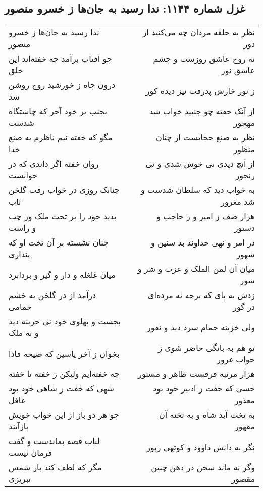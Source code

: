 \begin{center}
\section*{غزل شماره ۱۱۴۴: ندا رسید به جان‌ها ز خسرو منصور}
\label{sec:1144}
\begin{longtable}{l p{0.5cm} r}
ندا رسید به جان‌ها ز خسرو منصور
&&
نظر به حلقه مردان چه می‌کنید از دور
\\
چو آفتاب برآمد چه خفته‌اند این خلق
&&
نه روح عاشق روزست و چشم عاشق نور
\\
درون چاه ز خورشید روح روشن شد
&&
ز نور خارش پذرفت نیز دیده کور
\\
بجنب بر خود آخر که چاشتگاه شدست
&&
از آنک خفته چو جنبید خواب شد مهجور
\\
مگو که خفته نیم ناظرم به صنع خدا
&&
نظر به صنع حجابست از چنان منظور
\\
روان خفته اگر داندی که در خوابست
&&
از آنچ دیدی نی خوش شدی و نی رنجور
\\
چنانک روزی در خواب رفت گلخن تاب
&&
به خواب دید که سلطان شدست و شد مغرور
\\
بدید خود را بر تخت ملک وز چپ و راست
&&
هزار صف ز امیر و ز حاجب و دستور
\\
چنان نشسته بر آن تخت او که پنداری
&&
در امر و نهی خداوند بد سنین و شهور
\\
میان غلغله و دار و گیر و بردابرد
&&
میان آن لمن الملک و عزت و شر و شور
\\
درآمد از در گلخن به خشم حمامی
&&
زدش به پای که برجه نه مرده‌ای در گور
\\
بجست و پهلوی خود نی خزینه دید و نه ملک
&&
ولی خزینه حمام سرد دید و نفور
\\
بخوان ز آخر یاسین که صیحه فاذا
&&
تو هم به بانگی حاضر شوی ز خواب غرور
\\
چه خفته‌ایم ولیکن ز خفته تا خفته
&&
هزار مرتبه فرقست ظاهر و مستور
\\
شهی که خفت ز شاهی خود بود غافل
&&
خسی که خفت ز ادبیر خود بود معذور
\\
چو هر دو باز از این خواب خویش بازآیند
&&
به تخت آید شاه و به تخته آن مقهور
\\
لباب قصه بماندست و گفت فرمان نیست
&&
نگر به دانش داوود و کوتهی زبور
\\
مگر که لطف کند باز شمس تبریزی
&&
وگر نه ماند سخن در دهن چنین مقصور
\\
\end{longtable}
\end{center}
